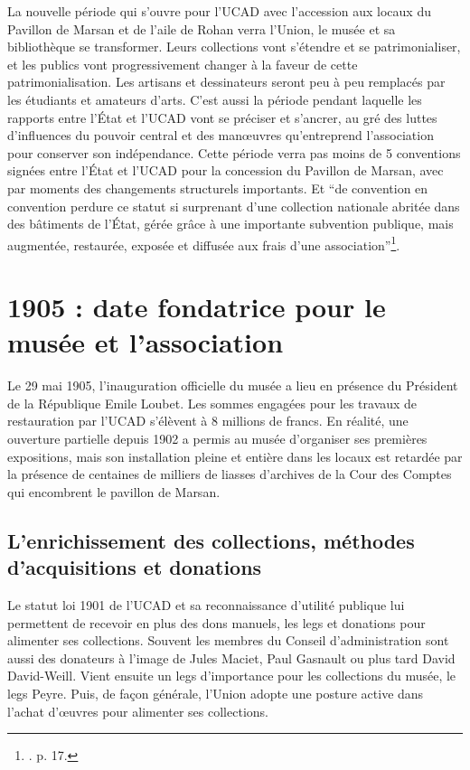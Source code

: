 La nouvelle période qui s'ouvre pour l'UCAD avec l'accession aux locaux du Pavillon de Marsan et de l'aile de Rohan verra l'Union, le musée et sa bibliothèque se transformer. Leurs collections vont s'étendre et se patrimonialiser, et les publics vont progressivement changer à la faveur de cette patrimonialisation. Les artisans et dessinateurs seront peu à peu remplacés par les étudiants et amateurs d'arts. C'est aussi la période pendant laquelle les rapports entre l'État et l'UCAD vont se préciser et s'ancrer, au gré des luttes d'influences du pouvoir central et des manœuvres qu'entreprend l'association pour conserver son indépendance. Cette période verra pas moins de 5 conventions signées entre l'État et l'UCAD pour la concession du Pavillon de Marsan, avec par moments des changements structurels importants. Et \enquote{de convention en convention perdure ce statut si surprenant d'une collection nationale abritée dans des bâtiments de l'État, gérée grâce à une importante subvention publique, mais augmentée, restaurée, exposée et diffusée aux frais d'une association}\footnote{\cite{gady_dessin_2020}. p. 17.}.

\section{1905 : date fondatrice pour le musée et l'association}

Le 29 mai 1905, l'inauguration officielle du musée a lieu en présence du Président de la République Emile Loubet. Les sommes engagées pour les travaux de restauration par l'UCAD s'élèvent à 8 millions de francs. En réalité, une ouverture partielle depuis 1902 a permis au musée d'organiser ses premières expositions, mais son installation pleine et entière dans les locaux est retardée par la présence de centaines de milliers de liasses d'archives de la Cour des Comptes qui encombrent le pavillon de Marsan. 

\subsection{L'enrichissement des collections, méthodes d'acquisitions et donations}

Le statut loi 1901 de l'UCAD et sa reconnaissance d'utilité publique lui permettent de recevoir en plus des dons manuels, les legs et donations pour alimenter ses collections. Souvent les membres du Conseil d'administration sont aussi des donateurs à l'image de Jules Maciet, Paul Gasnault ou plus tard David David-Weill. Vient ensuite un legs d'importance pour les collections du musée, le legs Peyre. Puis, de façon générale, l'Union adopte une posture active dans l'achat d’œuvres pour alimenter ses collections. 

